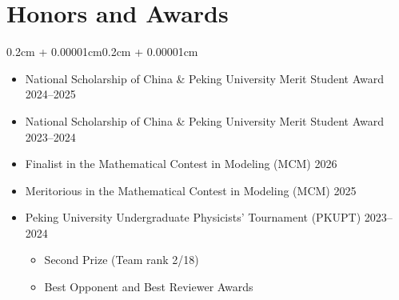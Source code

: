 \documentclass[10pt,letterpaper]{article}
\newenvironment{highlights}{
  \begin{itemize}[
    topsep=0.1cm,
    parsep=0.1cm,
    partopsep=0pt,
    itemsep=0pt,
    leftmargin=0.4cm + 10pt
  ]
}{
  \end{itemize}
}
\newenvironment{onecolentry}{
  \begin{adjustwidth}{0.2cm + 0.00001cm}{0.2cm + 0.00001cm}
}{
  \end{adjustwidth}
}
\begin{document}
  \section{Honors and Awards}
  \begin{onecolentry}
    \begin{highlights}
      \item National Scholarship of China \& Peking University Merit Student Award \hfill 2024--2025
      \item National Scholarship of China \& Peking University Merit Student Award \hfill 2023--2024
      \item Finalist in the Mathematical Contest in Modeling (MCM) \hfill 2026
      \item Meritorious in the Mathematical Contest in Modeling (MCM) \hfill 2025
      \item Peking University Undergraduate Physicists' Tournament (PKUPT) \hfill 2023--2024
        \begin{highlights}
          \item Second Prize (Team rank 2/18)
          \item Best Opponent and Best Reviewer Awards
        \end{highlights}
    \end{highlights}
  \end{onecolentry}
\end{document}
